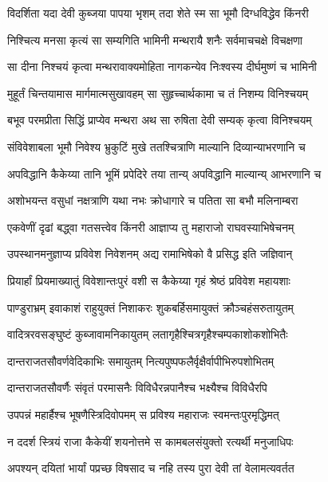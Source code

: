 
\twolineshloka
{विदर्शिता यदा देवी कुब्जया पापया भृशम्}
{तदा शेते स्म सा भूमौ दिग्धविद्धेव किंनरी} %

\twolineshloka
{निश्चित्य मनसा कृत्यं सा सम्यगिति भामिनी}
{मन्थरायै शनैः सर्वमाचचक्षे विचक्षणा} %

\twolineshloka
{सा दीना निश्चयं कृत्वा मन्थरावाक्यमोहिता}
{नागकन्येव निःश्वस्य दीर्घमुष्णं च भामिनी} %

\twolineshloka
{मुहूर्तं चिन्तयामास मार्गमात्मसुखावहम्}
{सा सुहृच्चार्थकामा च तं निशम्य विनिश्चयम्} %

\twolineshloka
{बभूव परमप्रीता सिद्धिं प्राप्येव मन्थरा}
{अथ सा रुषिता देवी सम्यक् कृत्वा विनिश्चयम्} %

\twolineshloka
{संविवेशाबला भूमौ निवेश्य भ्रुकुटिं मुखे}
{ततश्चित्राणि माल्यानि दिव्यान्याभरणानि च} %

\twolineshloka
{अपविद्धानि कैकेय्या तानि भूमिं प्रपेदिरे}
{तया तान्य् अपविद्धानि माल्यान्य् आभरणानि च} %

\twolineshloka
{अशोभयन्त वसुधां नक्षत्राणि यथा नभः}
{क्रोधागारे च पतिता सा बभौ मलिनाम्बरा} %

\twolineshloka
{एकवेणीं दृढां बद्ध्वा गतसत्त्वेव किंनरी}
{आज्ञाप्य तु महाराजो राघवस्याभिषेचनम्} %

\twolineshloka
{उपस्थानमनुज्ञाप्य प्रविवेश निवेशनम्}
{अद्य रामाभिषेको वै प्रसिद्ध इति जज्ञिवान्} %

\twolineshloka
{प्रियार्हां प्रियमाख्यातुं विवेशान्तःपुरं वशी}
{स कैकेय्या गृहं श्रेष्ठं प्रविवेश महायशाः} %

\twolineshloka
{पाण्डुराभ्रम् इवाकाशं राहुयुक्तं निशाकरः}
{शुकबर्हिसमायुक्तं क्रौञ्चहंसरुतायुतम्} %

\twolineshloka
{वादित्ररवसङ्घुष्टं कुब्जावामनिकायुतम्}
{लतागृहैश्चित्रगृहैश्चम्पकाशोकशोभितैः} %

\twolineshloka
{दान्तराजतसौवर्णवेदिकाभिः समायुतम्}
{नित्यपुष्पफलैर्वृक्षैर्वापीभिरुपशोभितम्} %

\twolineshloka
{दान्तराजतसौवर्णैः संवृतं परमासनैः}
{विविधैरन्नपानैश्च भक्ष्यैश्च विविधैरपि} %

\twolineshloka
{उपपन्नं महार्हैश्च भूषणैस्त्रिदिवोपमम्}
{स प्रविश्य महाराजः स्वमन्तःपुरमृद्धिमत्} %

\twolineshloka
{न ददर्श स्त्रियं राजा कैकेयीं शयनोत्तमे}
{स कामबलसंयुक्तो रत्यर्थी मनुजाधिपः} %

\twolineshloka
{अपश्यन् दयितां भार्यां पप्रच्छ विषसाद च}
{नहि तस्य पुरा देवी तां वेलामत्यवर्तत} %


